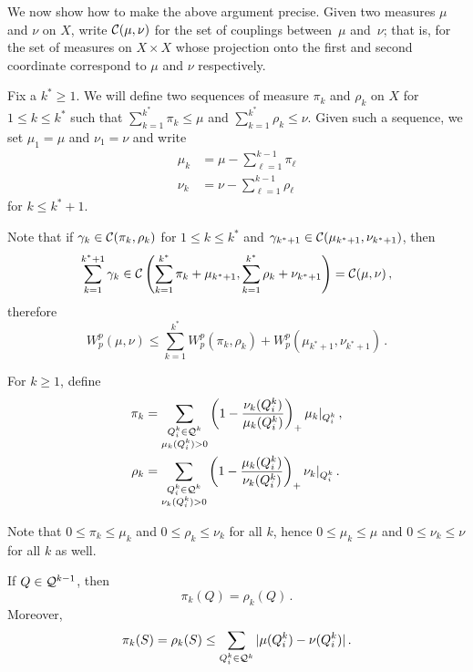 We now show how to make the above argument precise.
Given two measures $\mu$ and $\nu$ on $X$, write $\mathcal{C}(\mu, \nu)$ for the set of couplings between~$\mu$ and~$\nu$; that is, for the set of measures on $X \times X$ whose projection onto the first and second coordinate correspond to $\mu$ and $\nu$ respectively.

Fix a $k^* \geq 1$.
We will define two sequences of measure $\pi_k$ and $\rho_k$ on $X$ for $1 \leq k \leq k^*$ such that $\sum_{k=1}^{k^*} \pi_k \leq \mu$ and $\sum_{k=1}^{k^*} \rho_k \leq \nu$.
Given such a sequence, we set $\mu_1 = \mu$ and $\nu_1 = \nu$ and write
\begin{align*}
\mu_k  & = \mu - \sum_{\ell=1}^{k-1} \pi_\ell \\
\nu_k & = \nu - \sum_{\ell =1}^{k-1} \rho_\ell
\end{align*}
for $k \leq k^*+1$.

Note that if $\gamma_k \in \mathcal{C}(\pi_k, \rho_k)$ for $1 \leq k \leq k^*$ and $\gamma_{k^*+1} \in \mathcal{C}(\mu_{k^*+1}, \nu_{k^*+1})$, then
\begin{equation*}
\sum_{k=1}^{k^*+1} \gamma_k \in \mathcal{C}\left(\sum_{k=1}^{k^*} \pi_k + \mu_{k^*+1}, \sum_{k=1}^{k^*} \rho_k + \nu_{k^*+1}\right) = \mathcal{C}(\mu, \nu)\,,
\end{equation*}
therefore
\begin{equation*}
W_p^p (\mu, \nu) \leq \sum_{k=1}^{k^*} W_p^p(\pi_k, \rho_k) + W_p^p(\mu_{k^*+1}, \nu_{k^*+1})\,.
\end{equation*}

For $k \geq 1$, define
\begin{align*}
\pi_k &= \sum_{\substack{Q_i^k \in \mathcal{Q}^k\\\mu_k(Q_i^k) > 0}} \left(1 - \frac{\nu_k(Q_i^k)}{\mu_k(Q_i^k)} \right)_+ \mu_k|_{Q_i^k}\,, \\
\rho_k &= \sum_{\substack{Q_i^k \in \mathcal{Q}^k\\\nu_k(Q_i^k) > 0}} \left(1 - \frac{\mu_k(Q_i^k)}{\nu_k(Q_i^k)} \right)_+ \nu_k|_{Q_i^k}\,.
\end{align*}

Note that $0 \leq \pi_k \leq \mu_k$ and $0 \leq \rho_k \leq \nu_k$ for all $k$, hence $0 \leq \mu_k \leq \mu$ and $0 \leq \nu_k \leq \nu$ for all $k$ as well.

\begin{applemma}\label{lem:same_mass_pi_rho}
If $Q \in \mathcal{Q}^{k-1}$, then
\begin{equation*}
\pi_{k}(Q) = \rho_{k}(Q)\,.
\end{equation*}
Moreover,
\begin{equation*}
\pi_k(S) = \rho_k(S) \leq \sum_{Q_i^k \in \mathcal{Q}^k} |\mu(Q_i^k) - \nu(Q_i^k)|\,.
\end{equation*}
\end{applemma}

